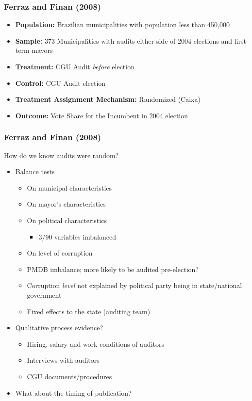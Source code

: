 \documentclass[xcolor=x11names,compress]{beamer}\usepackage[]{graphicx}\usepackage[]{color}
\renewcommand{\(}{\begin{columns}}
\renewcommand{\)}{\end{columns}}
\newcommand{\<}[1]{\begin{column}{#1}}
\renewcommand{\>}{\end{column}}
\begin{document}
\begin{frame}
\frametitle{Ferraz and Finan (2008)}
\begin{itemize}
\item \textbf{Population:} Brazilian municipalities with population less than 450,000
\pause
\item \textbf{Sample:} 373 Municipalities with audits either side of 2004 elections and first-term mayors
\pause
\item \textbf{Treatment:} CGU Audit \textit{before} election
\pause
\item \textbf{Control:} CGU Audit  election
\pause
\item \textbf{Treatment Assignment Mechanism:} Randomized (Caixa)
\pause
\item \textbf{Outcome:} Vote Share for the Incumbent in 2004 election
\end{itemize}
\end{frame}

\begin{frame}
\frametitle{Ferraz and Finan (2008)}
How do we know audits were random?
\pause
\begin{itemize}
\item Balance tests
\begin{itemize}
\item On municipal characteristics
\item On mayor's characteristics
\item On political characteristics
\begin{itemize}
\item 3/90 variables imbalanced
\end{itemize}
\item On level of corruption
\pause
\item PMDB imbalance; more likely to be audited pre-election?
\pause
\item Corruption \textit{level} not explained by political party being in state/national government
\pause
\item Fixed effects to the state (auditing team)
\end{itemize}
\pause
\item Qualitative process evidence?
\pause
\begin{itemize}
\item Hiring, salary and work conditions of auditors
\pause
\item Interviews with auditors
\pause
\item CGU documents/procedures
\pause
\end{itemize}
\item What about the timing of publication?
\end{itemize}
\end{frame}
\end{document}
